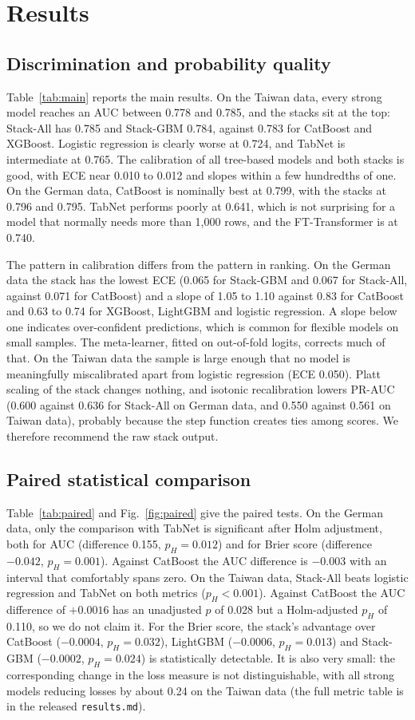 \documentclass[conference,a4paper]{IEEEtran}
\begin{document}
\section{Results}
\subsection{Discrimination and probability quality}
Table~\ref{tab:main} reports the main results. On the Taiwan data, every strong model reaches an AUC between 0.778 and 0.785, and the stacks sit at the top: Stack-All has 0.785 and Stack-GBM 0.784, against 0.783 for CatBoost and XGBoost. Logistic regression is clearly worse at 0.724, and TabNet is intermediate at 0.765. The calibration of all tree-based models and both stacks is good, with ECE near 0.010 to 0.012 and slopes within a few hundredths of one. On the German data, CatBoost is nominally best at 0.799, with the stacks at 0.796 and 0.795. TabNet performs poorly at 0.641, which is not surprising for a model that normally needs more than 1{,}000 rows, and the FT-Transformer is at 0.740.



The pattern in calibration differs from the pattern in ranking. On the German data the stack has the lowest ECE (0.065 for Stack-GBM and 0.067 for Stack-All, against 0.071 for CatBoost) and a slope of 1.05 to 1.10 against 0.83 for CatBoost and 0.63 to 0.74 for XGBoost, LightGBM and logistic regression. A slope below one indicates over-confident predictions, which is common for flexible models on small samples. The meta-learner, fitted on out-of-fold logits, corrects much of that. On the Taiwan data the sample is large enough that no model is meaningfully miscalibrated apart from logistic regression (ECE 0.050). Platt scaling of the stack changes nothing, and isotonic recalibration lowers PR-AUC (0.600 against 0.636 for Stack-All on German data, and 0.550 against 0.561 on Taiwan data), probably because the step function creates ties among scores. We therefore recommend the raw stack output.

\subsection{Paired statistical comparison}
Table~\ref{tab:paired} and Fig.~\ref{fig:paired} give the paired tests. On the German data, only the comparison with TabNet is significant after Holm adjustment, both for AUC (difference 0.155, $p_H=0.012$) and for Brier score (difference $-0.042$, $p_H=0.001$). Against CatBoost the AUC difference is $-0.003$ with an interval that comfortably spans zero. On the Taiwan data, Stack-All beats logistic regression and TabNet on both metrics ($p_H<0.001$). Against CatBoost the AUC difference of $+0.0016$ has an unadjusted $p$ of 0.028 but a Holm-adjusted $p_H$ of 0.110, so we do not claim it. For the Brier score, the stack's advantage over CatBoost ($-0.0004$, $p_H=0.032$), LightGBM ($-0.0006$, $p_H=0.013$) and Stack-GBM ($-0.0002$, $p_H=0.024$) is statistically detectable. It is also very small: the corresponding change in the loss measure is not distinguishable, with all strong models reducing losses by about 0.24 on the Taiwan data (the full metric table is in the released \texttt{results.md}).
\end{document}

